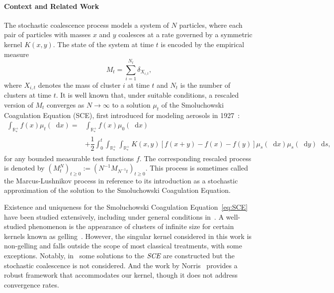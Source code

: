\documentclass[11pt,a4paper]{article}
\newcommand{\RRP}{\mathbb{R}^+_*}
\newcommand{\SCE}{\emph{SCE}}
\newcommand{\Proc}[1]{\left(#1\right)_{t\geq 0}}
\newcommand{\dd}{\mathop{}\!\mathrm{d}}
\begin{document}
\paragraph{Context and Related Work}

The stochastic coalescence process models a system of $N$ particles, where each pair of particles with masses $x$ and $y$ coalesces at a rate governed by a symmetric kernel $K(x,y)$. The state of the system at time $t$ is encoded by the empirical measure
\[
    M_t = \sum_{i=1}^{N_t} \delta_{X_{i,t}},
\]
where $X_{i,t}$ denotes the mass of cluster $i$ at time $t$ and $N_t$ is the number of clusters at time $t$. It is well known that, under suitable conditions, a rescaled version of $M_t$ converges as $N \to \infty$ to a solution $\mu_t$ of the Smoluchowski Coagulation Equation (SCE), first introduced for modeling aerosols in 1927~\cite{smoluchowski1927drei}:
\begin{equation}\label{eq:SCE}
    \begin{aligned}
    \int_{\RRP} f(x)\mu_t (\dd x) =& \int_{\RRP} f(x)\mu_0 (\dd x)\\
     &+ \dfrac12\int_0^t \int_{\RRP}\int_{\RRP} 
        K(x,y)\left[f(x+y) - f(x) - f(y)\right] \mu_s(\dd x)\mu_s(\dd y) \dd s,
    \end{aligned}
\end{equation}
for any bounded measurable test functions $f$. The corresponding rescaled process is denoted by $\Proc{M^N_t} := \Proc{N^{-1}M_{N^{-1}t}}$. This process is sometimes called the Marcus-Lushnikov process in reference to its introduction \cite{marcus1968stochastic,lushnikov1978coagulation} as a stochastic approximation of the solution to the Smoluchowski Coagulation Equation.

Existence and uniqueness for the Smoluchowski Coagulation Equation~\eqref{eq:SCE} have been studied extensively, including under general conditions in~\cite{laurencotClassContinuousCoagulationFragmentation2000,lambExistenceUniquenessResults2004,barikMassconservingSolutionsSmoluchowski2020}. A well-studied phenomenon is the appearance of clusters of infinite size for certain kernels known as gelling~\cite{escobedoGelationCoagulationFragmentation2002,fournier2025gelation}. However, the singular kernel considered in this work is non-gelling and falls outside the scope of most classical treatments, with some exceptions. Notably, in~\cite{fournierExistenceSelfSimilarSolutions2005} some solutions to the $\SCE$ are constructed but the stochastic coalescence is not considered. And the work by Norris~\cite{norrisSmoluchowskisCoagulationEquation1999} provides a robust framework that accommodates our kernel, though it does not address convergence rates.
\end{document}
